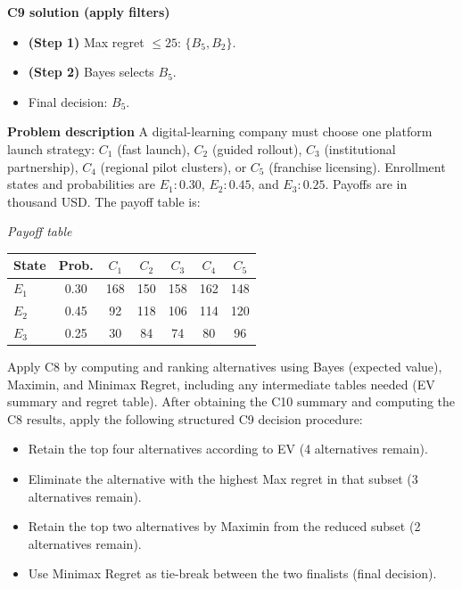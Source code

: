 \begin{ExamProblems}
		\textbf{C9 solution (apply filters)}\par
		\begin{itemize}
			\item \textbf{(Step 1)} Max regret $\leq 25$: $\{B_5,B_2\}$.
			\item \textbf{(Step 2)} Bayes selects $B_5$.
			\item Final decision: $B_5$.
		\end{itemize}
		
		\newpage
		\item
		\textbf{Problem description}
		A digital-learning company must choose one platform launch strategy: $C_1$ (fast launch), $C_2$ (guided rollout), $C_3$ (institutional partnership), $C_4$ (regional pilot clusters), or $C_5$ (franchise licensing).
		Enrollment states and probabilities are $E_1:0.30$, $E_2:0.45$, and $E_3:0.25$. Payoffs are in thousand USD. The payoff table is:
		
		\begin{center}
			\textit{Payoff table} \\
			\begin{tabular}{l c c c c c c}
				\hline
				State& Prob. & $C_1$ & $C_2$ & $C_3$ & $C_4$ & $C_5$ \\
				\hline
				$E_1$ & 0.30 & 168 & 150 & 158 & 162 & 148 \\
				$E_2$ & 0.45 & 92 & 118 & 106 & 114 & 120 \\
				$E_3$ & 0.25 & 30 & 84 & 74 & 80 & 96 \\
				\hline
			\end{tabular}
		\end{center}
		
		Apply C8 by computing and ranking alternatives using Bayes (expected value), Maximin, and Minimax Regret, including any intermediate tables needed (EV summary and regret table).
		After obtaining the C10 summary and computing the C8 results, apply the following structured C9 decision procedure:
		\begin{itemize}
			\item Retain the top four alternatives according to EV (4 alternatives remain).
			\item Eliminate the alternative with the highest Max regret in that subset (3 alternatives remain).
			\item Retain the top two alternatives by Maximin from the reduced subset (2 alternatives remain).
			\item Use Minimax Regret as tie-break between the two finalists (final decision).
		\end{itemize}
		

\end{ExamProblems}
